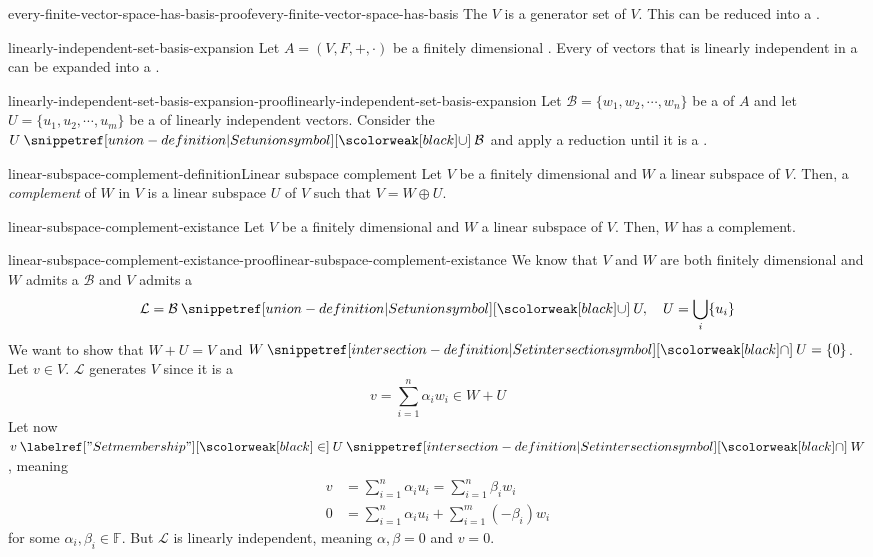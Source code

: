\documentclass[preview]{standalone}
\begin{document}
\begin{snippetproof}{every-finite-vector-space-has-basis-proof}{every-finite-vector-space-has-basis}{}
    The \set \(V\) is a generator set of \(V\). This \set can be reduced into a \basis.
\end{snippetproof}

\begin{snippetproposition}{linearly-independent-set-basis-expansion}{}
    Let \(A=(V, F, +, \cdot)\) be a finitely dimensional \vectorspace.
    Every \set of vectors that is linearly independent
    in a \vectorspace can be expanded into a \basis.
\end{snippetproposition}

\begin{snippetproof}{linearly-independent-set-basis-expansion-proof}{linearly-independent-set-basis-expansion}{}
    Let \(\mathcal{B} = \{w_1, w_2, \cdots, w_n\}\) be a \basis of \(A\)
    and let \(U = \{u_1, u_2, \cdots, u_m\}\) be a \set of linearly independent vectors.
    Consider the \set \(U \union \mathcal{B}\) and apply a reduction until it is a \basis. 
\end{snippetproof}

\begin{snippetdefinition}{linear-subspace-complement-definition}{Linear subspace complement}
    Let \(V\) be a finitely dimensional \vectorspace and \(W\) a linear subspace of \(V\).
    Then, a \emph{complement} of \(W\) in \(V\) is a linear subspace
    \(U\) of \(V\) such that \(V = W \oplus U\).
\end{snippetdefinition}

\begin{snippetproposition}{linear-subspace-complement-existance}{}
    Let \(V\) be a finitely dimensional \vectorspace and \(W\) a linear subspace of \(V\).
    Then, \(W\) has a complement.
\end{snippetproposition}

\begin{snippetproof}{linear-subspace-complement-existance-proof}{linear-subspace-complement-existance}{}
    We know that \(V\) and \(W\) are both finitely dimensional
    and \(W\) admits a \basis \(\mathcal{B}\) and \(V\) admits a \basis
    \[
        \mathcal{L} = \mathcal{B} \union U, \quad U = \bigcup_i \{u_i\}
    \]
    We want to show that \(W+U=V\) and \(W \intersection U = \{0\}\).
    Let \(v\in V\). \(\mathcal{L}\) generates \(V\) since it is a \basis
    \[
        v = \sum_{i=1}^n \alpha_i w_i \in W + U
    \]
    Let now \(v \in U \intersection W\), meaning
    \begin{align*}
        v &= \sum_{i=1}^n \alpha_i u_i = \sum_{i=1}^n \beta_i w_i \\
        0 &= \sum_{i=1}^n \alpha_i u_i + \sum_{i=1}^m (-\beta_i)w_i
    \end{align*}
    for some \(\alpha_i, \beta_i \in \mathbb{F}\).
    But \(\mathcal{L}\) is linearly independent, meaning \(\alpha, \beta = 0\)
    and \(v=0\).
\end{snippetproof}
\end{document}
